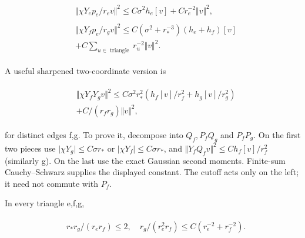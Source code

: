 \begin{gather*}
\begin{aligned}
& \Vert  \chi  Y_{e} p_{e}/r_{e} v\Vert ^{2}\le C \sigma ^{2}h_{e}[v]+Cr_{e}^{-2}\Vert v\Vert ^{2},
\end{aligned}\tag{2.1} \\
\begin{aligned}
& \Vert  \chi  Y_{f} p_{e}/r_{g} v\Vert ^{2}\le C( \sigma ^{2}+r_{*}^{-3})(h_{e}+h_{f})[v] \\
& +C \sum _{u \in  \text{ triangle }}r_{u}^{-2}\Vert v\Vert ^{2}.
\end{aligned}\tag{2.2}
\end{gather*}

A useful sharpened two-coordinate version is

\begin{gather*}
\begin{aligned}
& \Vert  \chi  Y_{f} Y_{g} v\Vert ^{2}\le C \sigma ^{2}r_{*}^{2}(h_{f}[v]/r_{f}^{2}+h_{g}[v]/r_{g}^{2}) \\
& +C/(r_{f} r_{g})\Vert v\Vert ^{2},
\end{aligned}\tag{2.3}
\end{gather*}

for distinct edges f,g. To prove it, decompose into
\(Q_{f}, P_{f}Q_{g}\) and \(P_{f}P_{g}\). On the first two pieces use
\(\vert  \chi  Y_{g}\vert \le C \sigma  r_{*}\) or
\(\vert  \chi  Y_{f}\vert \le C \sigma  r_{*}\), and
\(\Vert Y_{f}Q_{f} v\Vert ^{2}\le C h_{f}[v]/r_{f}^{2}\) (similarly g).
On the last use the exact Gaussian second moments. Finite-sum
Cauchy--Schwarz supplies the displayed constant. The cutoff acts only on
the left; it need not commute with \(P_{f}\).

In every triangle e,f,g,

\begin{gather*}
\begin{aligned}
& r_{*}r_{g}/(r_{e} r_{f})\le 2, \quad  r_{g}/(r_{e}^{2}r_{f})\le C(r_{e}^{-2}+r_{f}^{-2}).
\end{aligned}\tag{2.4}
\end{gather*}

